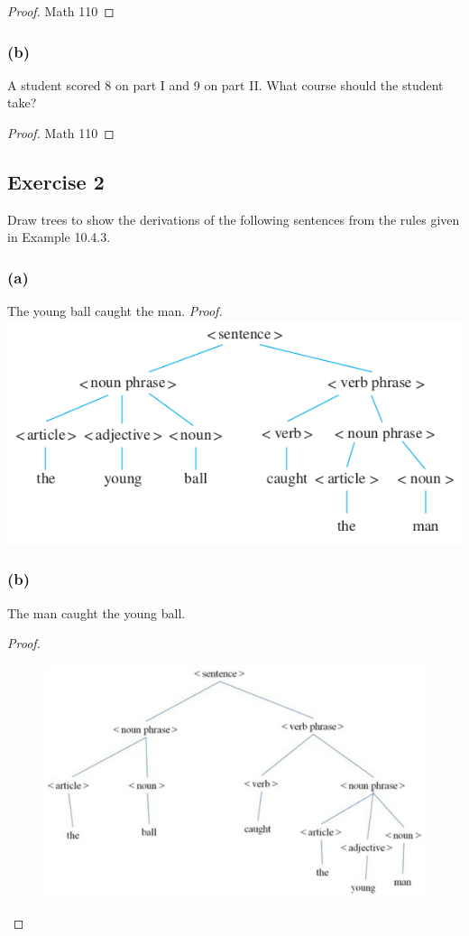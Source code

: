 \documentclass[14pt]{extarticle}
\begin{document}
\begin{proof}
    Math 110
\end{proof}

\subsubsection{(b)}
A student scored 8 on part I and 9 on part II. What course should the student take?

\begin{proof}
    Math 110
\end{proof}

\subsection{Exercise 2}
Draw trees to show the derivations of the following sentences from the rules given in Example 10.4.3.

\subsubsection{(a)}
The young ball caught the man. {\it Proof.} \includegraphics[scale=0.45]{../images/10.4.2.a.png}

\subsubsection{(b)}
The man caught the young ball.
\begin{proof}
    \begin{figure}[ht!]
        \centering
        \includegraphics[scale=0.28]{../images/10.4.2.b.png}
    \end{figure}
\end{proof}
\end{document}
